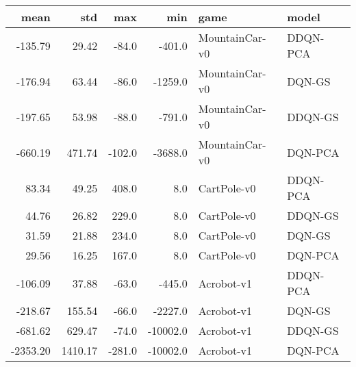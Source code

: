 \begin{tabular}{rrrrll}
\toprule
    mean &      std &    max &      min &            game &            model \\
\midrule
 -135.79 &    29.42 &  -84.0 &   -401.0 &  MountainCar-v0 &         DDQN-PCA \\
 -176.94 &    63.44 &  -86.0 &  -1259.0 &  MountainCar-v0 &           DQN-GS \\
 -197.65 &    53.98 &  -88.0 &   -791.0 &  MountainCar-v0 &          DDQN-GS \\
 -660.19 &   471.74 & -102.0 &  -3688.0 &  MountainCar-v0 &          DQN-PCA \\
   83.34 &    49.25 &  408.0 &      8.0 &     CartPole-v0 &         DDQN-PCA \\
   44.76 &    26.82 &  229.0 &      8.0 &     CartPole-v0 &          DDQN-GS \\
   31.59 &    21.88 &  234.0 &      8.0 &     CartPole-v0 &           DQN-GS \\
   29.56 &    16.25 &  167.0 &      8.0 &     CartPole-v0 &          DQN-PCA \\
 -106.09 &    37.88 &  -63.0 &   -445.0 &      Acrobot-v1 &         DDQN-PCA \\
 -218.67 &   155.54 &  -66.0 &  -2227.0 &      Acrobot-v1 &           DQN-GS \\
 -681.62 &   629.47 &  -74.0 & -10002.0 &      Acrobot-v1 &          DDQN-GS \\
-2353.20 &  1410.17 & -281.0 & -10002.0 &      Acrobot-v1 &          DQN-PCA \\
\bottomrule
\end{tabular}
